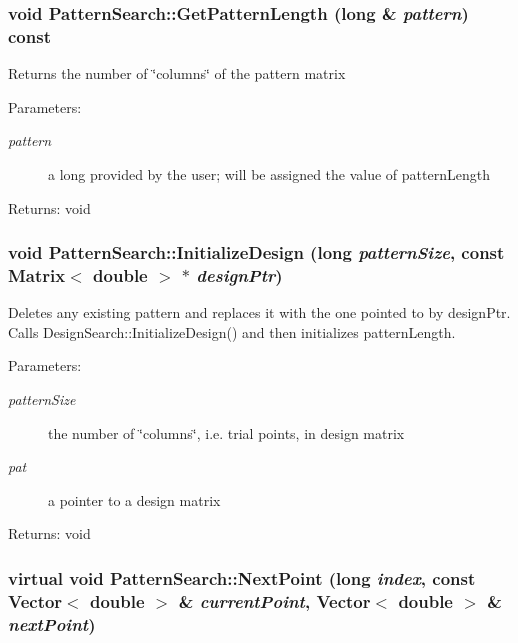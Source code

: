 \subsubsection{\setlength{\rightskip}{0pt plus 5cm}void Pattern\-Search::Get\-Pattern\-Length (long \& {\em pattern}) const}\label{classPatternSearch_z21_0}


Returns the number of \char`\"{}columns\char`\"{} of the pattern matrix \begin{Desc}
\item[Parameters:]
\begin{description}
\item[{\em pattern}]a long provided by the user; will be assigned the value of pattern\-Length \end{description}
\end{Desc}
\begin{Desc}
\item[Returns:]void \end{Desc}
\subsubsection{\setlength{\rightskip}{0pt plus 5cm}void Pattern\-Search::Initialize\-Design (long {\em pattern\-Size}, const Matrix$<$ double $>$ $\ast$ {\em design\-Ptr})}\label{classPatternSearch_z17_3}


Deletes any existing pattern and replaces it with the one pointed to by design\-Ptr. Calls Design\-Search::Initialize\-Design() and then initializes pattern\-Length. \begin{Desc}
\item[Parameters:]
\begin{description}
\item[{\em pattern\-Size}]the number of \char`\"{}columns\char`\"{}, i.e. trial points, in design matrix \item[{\em pat}]a pointer to a design matrix \end{description}
\end{Desc}
\begin{Desc}
\item[Returns:]void \end{Desc}
\subsubsection{\setlength{\rightskip}{0pt plus 5cm}virtual void Pattern\-Search::Next\-Point (long {\em index}, const Vector$<$ double $>$ \& {\em current\-Point}, Vector$<$ double $>$ \& {\em next\-Point})\hspace{0.3cm}{\tt  [protected, virtual]}}\label{classPatternSearch_b3}


